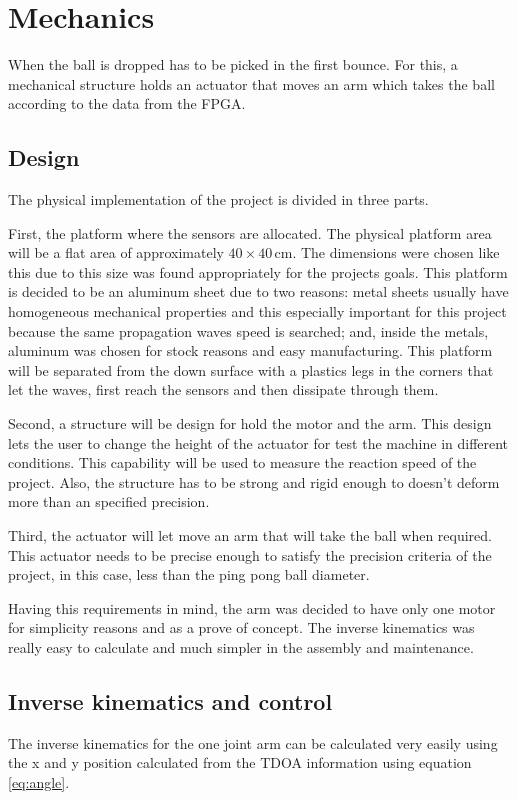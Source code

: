 \chapter{Mechanics} %
\label{chap:mechanics}
	When the ball is dropped has to be picked in the first bounce. 
	For this, a mechanical structure holds an actuator that moves an arm which takes the ball according to the data from the FPGA.

	\section{Design} %
	\label{sec:mechanics_design}
		The physical implementation of the project is divided in three parts.

		First, the platform where the sensors are allocated. 
		The physical platform area will be a flat area of approximately $40\times40\,\si{\centi\meter}$.
		The dimensions were chosen like this due to this size was found appropriately for the projects goals.
		This platform is decided to be an aluminum sheet due to two reasons: metal sheets usually have homogeneous mechanical properties and this especially important for this project because the same propagation waves speed is searched; and, inside the metals, aluminum was chosen for stock reasons and easy manufacturing. 
		This platform will be separated from the down surface with a plastics legs in the corners that let the waves, first reach the sensors and then dissipate through them.

		Second, a structure will be design for hold the motor and the arm. 
		This design lets the user to change the height of the actuator for test the machine in different conditions. 
		This capability will be used to measure the reaction speed of the project. 
		Also, the structure has to be strong and rigid enough to doesn't deform more than an specified precision.

		Third, the actuator will let move an arm that will take the ball when required. 
		This actuator needs to be precise enough to satisfy the precision criteria of the project, in this case, less than the ping pong ball diameter. 
			
		Having this requirements in mind, the arm was decided to have only one motor for simplicity reasons and as a prove of concept. 
		The inverse kinematics was really easy to calculate and much simpler in the assembly and maintenance.

	\section{Inverse kinematics and control }
	\label{sec:mechanics_kinematics}
		The inverse kinematics for the one joint arm can be calculated very easily using the x and y position calculated from the TDOA information using equation \ref{eq:angle}.

